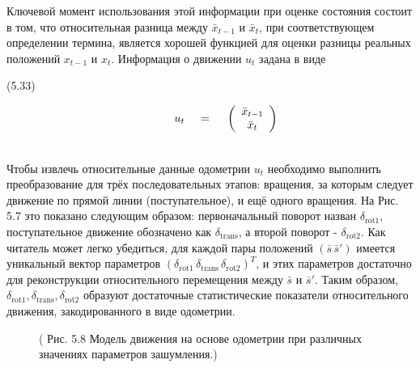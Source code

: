 \documentclass[10pt,a4paper]{article}
\begin{document}
Ключевой момент использования этой информации при оценке состояния состоит в том, что относительная разница между $\bar{x}_{t-1}$ и $\bar{x}_t$, при соответствующем определении термина, является хорошей функцией для оценки разницы реальных положений $x_{t-1}$ и $x_t$. Информация о движении $u_t$ задана в виде 

(5.33)
\begin{minipage}{0.3\textwidth}
	\begin{equation*}
	\hspace{10mm}
	u_t \hspace{5mm}
	\mbox{=}
	\hspace{5mm}
	\left(\begin{array}{c}
	\bar{x}_{t-1}\\
	\bar{x}_t\\
	\end{array}\right)
	\end{equation*}
\end{minipage}\\
Чтобы извлечь относительные данные одометрии $u_t$ необходимо выполнить преобразование для трёх последовательных этапов:
вращения, за которым следует движение по прямой линии (поступательное), и ещё одного вращения. На Рис. 5.7 это показано следующим образом: первоначальный поворот назван $\delta_{\text{rot}1}$, поступательное движение обозначено как $\delta_{\text{trans}}$, а второй поворот - $\delta_{\text{rot}2}$. Как читатель может легко убедиться, для каждой пары положений  $(\bar{s}\,\bar{s}')$ имеется уникальный вектор параметров $(\delta_{\text{rot}1}\,\delta_{\text{trans}}\,\delta_{\text{rot}2})^T$, и этих параметров достаточно для реконструкции
относительного перемещения между $\bar{s}$ и $\bar{s}'$. Таким образом, $\delta_{\text{rot}1}, \delta_{\text{trans}}, \delta_{\text{rot}2}$ образуют достаточные статистические показатели относительного движения, закодированного в виде одометрии.

\begin{figure}[H]
	\caption{ (  Рис. 5.8 Модель движения на основе одометрии при различных значениях параметров зашумления.)}
	\label{fig:58orig}
\end{figure}
\end{document}
